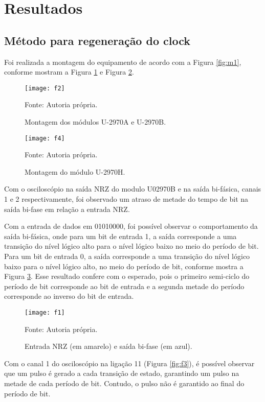 \newpage
\section{Resultados}

\subsection{Método para regeneração do clock}

	Foi realizada a montagem do equipamento de acordo com a Figura \ref{fig:m1}, conforme mostram a Figura \ref{fig:f2} e Figura \ref{fig:f4}.

\begin{figure}[H]
	\centering
	\caption{Montagem dos módulos U-2970A e U-2970B.}
	\texttt{[image: f2]}
	
	\small Fonte: Autoria própria.
	\label{fig:f2}
\end{figure}

\begin{figure}[H]
	\centering
	\caption{Montagem do módulo U-2970H.}
	\texttt{[image: f4]}
	
	\small Fonte: Autoria própria.
	\label{fig:f4}
\end{figure}

	Com o osciloscópio na saída NRZ do modulo U02970B e na saída bi-fásica, canais 1 e 2 respectivamente, foi observado um atraso de metade do tempo de bit na saída bi-fase em relação a entrada NRZ.
	
	Com a entrada de dados em 01010000, foi possível observar o comportamento da saída bi-fásica, onde para um bit de entrada 1, a saída corresponde a uma transição do nível lógico alto para o nível lógico baixo no meio do período de bit. Para um bit de entrada 0, a saída corresponde a uma transição do nível lógico baixo para o nível lógico alto, no meio do período de bit, conforme mostra a Figura \ref{fig:f1}. Esse resultado confere com o esperado, pois o primeiro semi-ciclo do período de bit corresponde ao bit de entrada e a segunda metade do período corresponde ao inverso do bit de entrada.
	
	\begin{figure}[H]
		\centering
		\caption{Entrada NRZ (em amarelo) e saída bi-fase (em azul).}
		\texttt{[image: f1]}
		
		\small Fonte: Autoria própria.
		\label{fig:f1}
	\end{figure}
	
	Com o canal 1 do osciloscópio na ligação 11 (Figura \ref{fig:f3}), é possível observar que um pulso é gerado a cada transição de estado, garantindo um pulso na metade de cada período de bit. Contudo, o pulso não é garantido ao final do período de bit.
	
